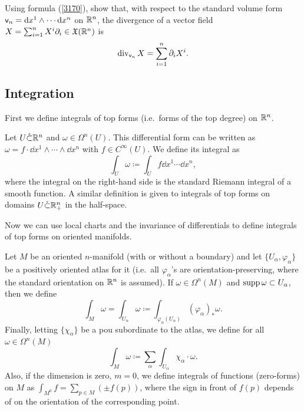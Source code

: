 \begin{xca}
    Using formula (\ref{3170}), show that, with respect to the standard volume form $\mathsf{v}_n={\mathrm{d}} x^1\wedge \cdots{\mathrm{d}} x^n$ on $\mathbb{R}^n$, the divergence of a vector field $X=\sum_{i=1}^n X^i\partial_i\in\mathfrak{X}(\mathbb{R}^n)$ is 
    \[\operatorname{div}_{\mathsf{v}_n} X=\sum_{i=1}^n \partial_i X^i.\]
\end{xca}









\subsection{Integration}

First we define integrals of top forms (i.e.\ forms of the top degree) on $\mathbb{R}^n$.
\begin{defn}
Let $U\mathring\subset \mathbb{R}^n$ and $\omega\in \Omega^n(U)$. This differential form can be written as $\omega=f\cdot \dd x^1\wedge\cdots\wedge\dd x^n $ with $f\in C^\infty(U)$. We define its integral as
\[\int_U\omega \coloneqq \int_U f \dd x^1\cdots\dd x^n,\]
where the integral on the right-hand side is the standard Riemann integral of a smooth function. A similar definition is given to integrals of top forms on domains $U\mathring\subset \mathbb{R}^n_+$ in the half-space.
\end{defn}

Now we can use local charts and the invariance of differentials to define integrals of top forms on oriented manifolds.

\begin{defn}
    Let $M$ be an oriented $n$-manifold (with or without a boundary) and let $\{U_\alpha,\varphi_\alpha\}$ be a positively oriented atlas for it (i.e.\ all $\varphi_\alpha$'s are orientation-preserving, where the standard orientation on $\mathbb{R}^n$ is assumed). If $\omega\in\Omega^n(M)$ and $\operatorname{supp}\omega\subset U_\alpha$, then we define
    \[\int_M \omega= \int_{U_\alpha}\omega \coloneqq \int_{\varphi_\alpha( U_\alpha)}(\varphi_\alpha)_\ast \omega.\]
    Finally, letting $\{\chi_\alpha\}$ be a \gls{pou} subordinate to the atlas, we define for all $\omega\in\Omega^n(M)$
    \[\int_M \omega\coloneqq \sum_\alpha \int_{U_\alpha}\chi_\alpha\cdot\omega.\]
    Also, if the dimension is zero, $m=0$, we define integrals of functions (zero-forms) on $M$ as $\int_{M^0}f=\sum_{p\in M}(\pm f(p))$, where the sign in front of $f(p)$ depends of on the orientation of the corresponding point.
\end{defn}


